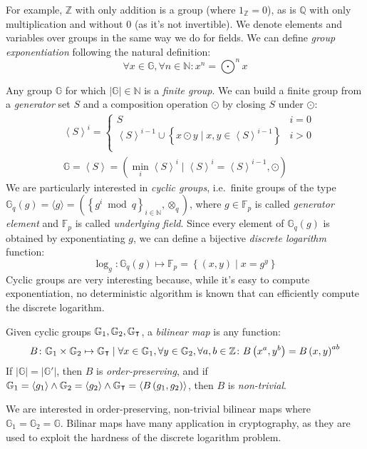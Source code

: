 \noindent For example, \(\mathbb{Z}\) with only addition is a group (where \(1_{\mathbb{Z}} = 0\)),
as is \(\mathbb{Q}\) with only multiplication and without \(0\) (as it's not invertible).
We denote elements and variables over groups in the same way we do for fields.
We can define \emph{group exponentiation} following the natural definition:
\[\forall x \in \mathbb{G}, \forall n \in \mathbb{N}\colon x^n = \bigodot^{n}{x}\]

Any group \(\mathbb{G}\) for which \(\left|\mathbb{G}\right| \in \mathbb{N}\) is a \emph{finite group}.
We can build a finite group from a \emph{generator} set \(S\) and a composition operation
\(\odot \) by closing \(S\) under \(\odot \):
\begin{align*}
	 & {\left\langle{S}\right\rangle}^i =
	\begin{cases}
		S                                            & i = 0
		\\
		{\left\langle{S}\right\rangle}^{i-1} \cup \left\{x \odot y \mid x,y \in
		{\left\langle{S}\right\rangle}^{i-1}\right\} & i > 0
		\\
	\end{cases}
	\\
	 & \mathbb{G} = \left\langle{S}\right\rangle =
	\left(\min_{i}{{\left\langle{S}\right\rangle}^{i}} \mid
	{\left\langle{S}\right\rangle}^{i} = {\left\langle{S}\right\rangle}^{i-1}, \odot\right)
\end{align*}
We are particularly interested in \emph{cyclic groups}, i.e.\ finite groups of the type
\(\mathbb{G}_q\left(g\right) = \langle{g}\rangle = \left({\left\{g^i \bmod q\right\}}_{i \in
	\mathbb{N}}, \otimes_q\right)\), where \(g \in \mathbb{F}_p\) is called \emph{generator element}
and \(\mathbb{F}_p\) is called \emph{underlying field}.
Since every element of \(\mathbb{G}_q\left(g\right)\) is obtained by exponentiating \(g\), we can
define a bijective \emph{discrete logarithm} function:
\[
	\log_g\colon \mathbb{G}_q\left(g\right) \mapsto \mathbb{F}_p =
	\left\{\left(x, y\right) \mid x = g^y\right\}
\]
Cyclic groups are very interesting because, while it's easy to compute exponentiation, no
deterministic algorithm is known that can efficiently compute the discrete logarithm.
\begin{definition}
	Given cyclic groups \(\mathbb{G}_1, \mathbb{G}_2, \mathbb{G}_{\transpose}\), a
	\emph{bilinear map} is any function:
	\[
		B\colon \mathbb{G}_1 \times \mathbb{G}_2 \mapsto \mathbb{G}_{\transpose} \mid
		\forall x \in \mathbb{G}_1, \forall y \in \mathbb{G}_2, \forall a,b \in \mathbb{Z}\colon
		B\left(x^a, y^b\right) = {B\left(x, y\right)}^{ab}
	\]
	If \(\left|\mathbb{G}\right| = \left|\mathbb{G}'\right|\), then \(B\) is \emph{order-preserving},
	and if \(\mathbb{G}_1 = \left\langle{g_1}\right\rangle \land \mathbb{G}_2 =
	\left\langle{g_2}\right\rangle \land
	\mathbb{G}_{\transpose} = \left\langle{B\left(g_1, g_2\right)}\right\rangle \), then \(B\) is
	\emph{non-trivial}.
\end{definition}

\noindent We are interested in order-preserving, non-trivial bilinear maps where
\(\mathbb{G}_1 = \mathbb{G}_2 = \mathbb{G}\).
Bilinar maps have many application in cryptography, as they are used to exploit the hardness of
the discrete logarithm problem.

